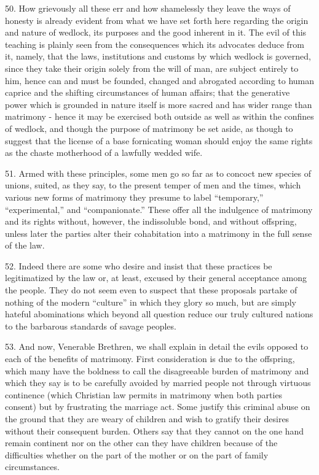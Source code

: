 \documentclass[12pt,a4paper]{book}
\begin{document}
50. How grievously all these err and how shamelessly they leave the ways of honesty is already evident from what we have set forth here regarding the origin and nature of wedlock, its purposes and the good inherent in it. The evil of this teaching is plainly seen from the consequences which its advocates deduce from it, namely, that the laws, institutions and customs by which wedlock is governed, since they take their origin solely from the will of man, are subject entirely to him, hence can and must be founded, changed and abrogated according to human caprice and the shifting circumstances of human affairs; that the generative power which is grounded in nature itself is more sacred and has wider range than matrimony - hence it may be exercised both outside as well as within the confines of wedlock, and though the purpose of matrimony be set aside, as though to suggest that the license of a base fornicating woman should enjoy the same rights as the chaste motherhood of a lawfully wedded wife.

51. Armed with these principles, some men go so far as to concoct new species of unions, suited, as they say, to the present temper of men and the times, which various new forms of matrimony they presume to label ``temporary,'' ``experimental,'' and ``companionate.'' These offer all the indulgence of matrimony and its rights without, however, the indissoluble bond, and without offspring, unless later the parties alter their cohabitation into a matrimony in the full sense of the law.

52. Indeed there are some who desire and insist that these practices be legitimatized by the law or, at least, excused by their general acceptance among the people. They do not seem even to suspect that these proposals partake of nothing of the modern ``culture'' in which they glory so much, but are simply hateful abominations which beyond all question reduce our truly cultured nations to the barbarous standards of savage peoples.

53. And now, Venerable Brethren, we shall explain in detail the evils opposed to each of the benefits of matrimony. First consideration is due to the offspring, which many have the boldness to call the disagreeable burden of matrimony and which they say is to be carefully avoided by married people not through virtuous continence (which Christian law permits in matrimony when both parties consent) but by frustrating the marriage act. Some justify this criminal abuse on the ground that they are weary of children and wish to gratify their desires without their consequent burden. Others say that they cannot on the one hand remain continent nor on the other can they have children because of the difficulties whether on the part of the mother or on the part of family circumstances.
\end{document}
